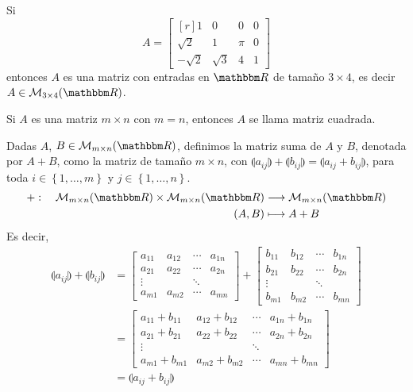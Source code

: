 \begin{example}
    Si
    $$A = \begin{bmatrix*}[r]
        1 & 0 & 0 & 0 \\
        \sqrt{2} & 1 & \pi & 0 \\
        -\sqrt{2} & \sqrt{3} & 4 & 1
    \end{bmatrix*}$$
    entonces $A$ es una matriz con entradas en $\RR$ de tamaño $3 \times 4$, es decir $A \in \mathcal{M}_{3 \times 4} (\RR)$.
\end{example}

\begin{observation}
    Si $A$ es una matriz $m \times n$ con $m = n$, entonces $A$ se llama matriz cuadrada.
\end{observation}

\begin{definition}
    Dadas $A$, $B \in \matrizmn$, definimos la matriz suma de $A$ y $B$, denotada por $A + B$, como la matriz de tamaño $m \times n$, con $\llparenthesis a_{ij} \rrparenthesis + \llparenthesis b_{ij} \rrparenthesis = \llparenthesis a_{ij} + b_{ij} \rrparenthesis$, para toda $i \in \left\lbrace 1, \dots, m \right\rbrace$ y $j \in \left\lbrace 1, \dots, n \right\rbrace$.
    \begin{align*}
        + : \quad \matrizmn \times \matrizmn & \longrightarrow \matrizmn \\
        (A, B ) & \longmapsto A + B
    \end{align*}
    Es decir,
    \begin{align*}
        \llparenthesis a_{ij} \rrparenthesis + \llparenthesis b_{ij} \rrparenthesis & = \begin{bmatrix}
        a_{11} & a_{12} & \cdots & a_{1n}\\
        a_{21} & a_{22} & \cdots & a_{2n}\\
        \vdots &  & \ddots & \\
        a_{m1} & a_{m2} & \cdots & a_{mn}
    \end{bmatrix} + \begin{bmatrix}
        b_{11} & b_{12} & \cdots & b_{1n}\\
        b_{21} & b_{22} & \cdots & b_{2n}\\
        \vdots &  & \ddots & \\
        b_{m1} & b_{m2} & \cdots & b_{mn}
    \end{bmatrix} \\
    & = \begin{bmatrix}
        a_{11} + b_{11} & a_{12} + b_{12} & \cdots & a_{1n} + b_{1n}\\
        a_{21} + b_{21} & a_{22} + b_{22} & \cdots & a_{2n} + b_{2n}\\
        \vdots &  & \ddots & \\
        a_{m1} + b_{m1} & a_{m2} + b_{m2} & \cdots & a_{mn} + b_{mn}
    \end{bmatrix} \\
    & = \llparenthesis a_{ij} + b_{ij} \rrparenthesis
    \end{align*}
\end{definition}

